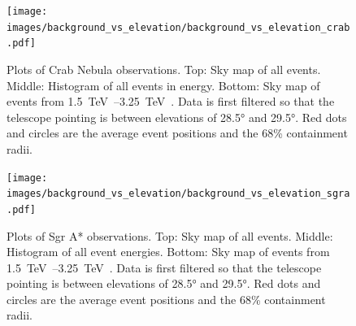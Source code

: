 % 
%
\begin{figure}[p]
  \centering
  \texttt{[image: images/background\_vs\_elevation/background\_vs\_elevation\_crab.pdf]}
  \caption[Background Vs Elevation Crab Nebula]
  {\small 
    Plots of Crab Nebula observations.
    Top: Sky map of all events.
    Middle: Histogram of all events in energy.
    Bottom: Sky map of events from \SIrange{1.5}{3.25}{\TeV{}}.  
    Data is first filtered so that the telescope pointing is between elevations of \ang{28.5} and \ang{29.5}.
    Red dots and circles are the average event positions and the 68\% containment radii.
  }
  \label{fig:bkgvsel_crab}
\end{figure}
    
\begin{figure}[p]
  \centering
  \texttt{[image: images/background\_vs\_elevation/background\_vs\_elevation\_sgra.pdf]}
  \caption[Background Vs Elevation Sgr A*]
  {\small 
    Plots of Sgr A* observations.
    Top: Sky map of all events.
    Middle: Histogram of all event energies.
    Bottom: Sky map of events from \SIrange{1.5}{3.25}{\TeV{}}.  
    Data is first filtered so that the telescope pointing is between elevations of \ang{28.5} and \ang{29.5}.
    Red dots and circles are the average event positions and the 68\% containment radii.
  }
  \label{fig:bkgvsel_sgra}
\end{figure}

